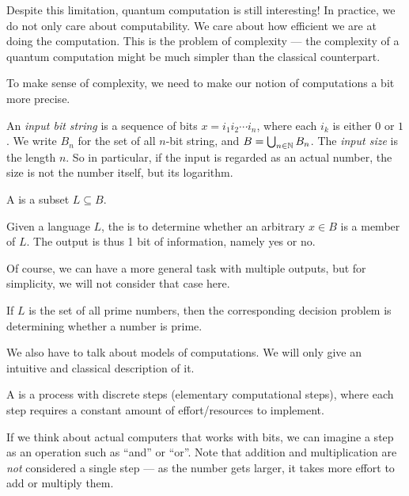Despite this limitation, quantum computation is still interesting! In practice, we do not only care about computability. We care about how efficient we are at doing the computation. This is the problem of complexity --- the complexity of a quantum computation might be much simpler than the classical counterpart.

To make sense of complexity, we need to make our notion of computations a bit more precise.

\begin{defi}
  An \emph{input bit string} is a sequence of bits $x = i_1i_2 \cdots i_n$, where each $i_k$ is either $0$ or $1$. We write $B_n$ for the set of all $n$-bit string, and $B = \bigcup_{n \in \mathbb{N}} B_n$. The \emph{input size} is the length $n$. So in particular, if the input is regarded as an actual number, the size is not the number itself, but its logarithm.
\end{defi}

\begin{defi}[Language]
  A  is a subset $L\subseteq B$.
\end{defi}

\begin{defi}
  Given a language $L$, the  is to determine whether an arbitrary $x \in B$ is a member of $L$. The output is thus 1 bit of information, namely yes or no.
\end{defi}
Of course, we can have a more general task with multiple outputs, but for simplicity, we will not consider that case here.

\begin{eg}
  If $L$ is the set of all prime numbers, then the corresponding decision problem is determining whether a number is prime.
\end{eg}

We also have to talk about models of computations. We will only give an intuitive and classical description of it.
\begin{defi}
  A  is a process with discrete steps (elementary computational steps), where each step requires a constant amount of effort/resources to implement.
\end{defi}
If we think about actual computers that works with bits, we can imagine a step as an operation such as ``and'' or ``or''. Note that addition and multiplication are \emph{not} considered a single step --- as the number gets larger, it takes more effort to add or multiply them.

